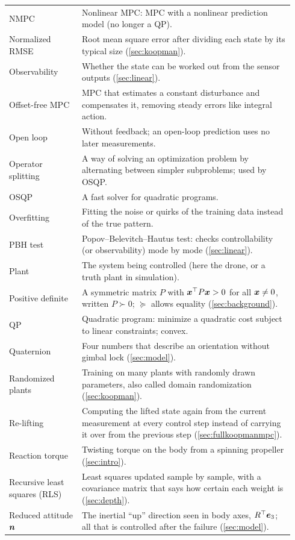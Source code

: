 \begin{longtable}{p{0.24\linewidth}p{0.70\linewidth}}
NMPC & Nonlinear MPC: MPC with a nonlinear prediction model (no longer a QP). \\
Normalized RMSE & Root mean square error after dividing each state by its typical size (\ref{sec:koopman}). \\
Observability & Whether the state can be worked out from the sensor outputs (\ref{sec:linear}). \\
Offset-free MPC & MPC that estimates a constant disturbance and compensates it, removing steady errors like integral action. \\
Open loop & Without feedback; an open-loop prediction uses no later measurements. \\
Operator splitting & A way of solving an optimization problem by alternating between simpler subproblems; used by OSQP. \\
OSQP & A fast solver for quadratic programs. \\
Overfitting & Fitting the noise or quirks of the training data instead of the true pattern. \\
PBH test & Popov--Belevitch--Hautus test: checks controllability (or observability) mode by mode (\ref{sec:linear}). \\
Plant & The system being controlled (here the drone, or a truth plant in simulation). \\
Positive definite & A symmetric matrix $P$ with $\boldsymbol{x}^\top P\boldsymbol{x}>0$ for all $\boldsymbol{x}\ne0$, written $P\succ0$; $\succeq$ allows equality (\ref{sec:background}). \\
QP & Quadratic program: minimize a quadratic cost subject to linear constraints; convex. \\
Quaternion & Four numbers that describe an orientation without gimbal lock (\ref{sec:model}). \\
Randomized plants & Training on many plants with randomly drawn parameters, also called domain randomization (\ref{sec:koopman}). \\
Re-lifting & Computing the lifted state again from the current measurement at every control step instead of carrying it over from the previous step (\ref{sec:fullkoopmanmpc}). \\
Reaction torque & Twisting torque on the body from a spinning propeller (\ref{sec:intro}). \\
Recursive least squares (RLS) & Least squares updated sample by sample, with a covariance matrix that says how certain each weight is (\ref{sec:depth}). \\
Reduced attitude $\boldsymbol{n}$ & The inertial ``up'' direction seen in body axes, $R^\top\boldsymbol{e}_3$; all that is controlled after the failure (\ref{sec:model}). \\

\end{longtable}
